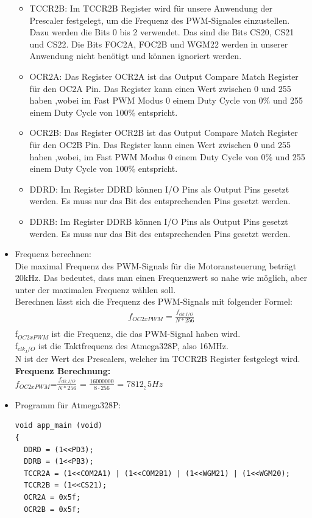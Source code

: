 \begin{itemize}
\begin{itemize}
\begin{itemize}
\end{itemize} 
\item TCCR2B: Im TCCR2B Register wird für unsere Anwendung der Prescaler festgelegt, um die Frequenz des PWM-Signales einzustellen. Dazu werden die Bits 0 bis 2 verwendet. Das sind die Bits CS20, CS21 und CS22. Die Bits FOC2A, FOC2B und WGM22 werden in unserer Anwendung nicht benötigt und können ignoriert werden. \\
\item OCR2A: Das Register OCR2A ist das Output Compare Match Register für den OC2A Pin. Das Register kann einen Wert zwischen 0 und 255 haben ,wobei im Fast PWM Modus 0 einem Duty Cycle von 0\% und 255 einem Duty Cycle von 100\% entspricht.\\
\item OCR2B: Das Register OCR2B ist das Output Compare Match Register für den OC2B Pin. Das Register kann einen Wert zwischen 0 und 255 haben ,wobei, im Fast PWM Modus 0 einem Duty Cycle von 0\% und 255 einem Duty Cycle von 100\% entspricht.\\
\item DDRD: Im Register DDRD können I/O Pins als Output Pins gesetzt werden. Es muss nur das Bit des entsprechenden Pins gesetzt werden.\\
\item DDRB: Im Register DDRB können I/O Pins als Output Pins gesetzt werden. Es muss nur das Bit des entsprechenden Pins gesetzt werden.\\
\end{itemize}
\item Frequenz berechnen:\\
Die maximal Frequenz des PWM-Signals für die Motoransteuerung beträgt 20kHz. Das bedeutet, dass man einen Frequenzwert so nahe wie möglich, aber unter der maximalen Frequenz wählen soll.\\
Berechnen lässt sich die Frequenz des PWM-Signals mit folgender Formel:
\begin{align*}
f_{OC2xPWM}=\frac{f_{clk\_I/O}}{N*256} \\
\end{align*} 
f$_{OC2xPWM}$ ist die Frequenz, die das PWM-Signal haben wird.\\
f$_{clk_I/O}$ ist die Taktfrequenz des Atmega328P, also 16MHz. \\
N ist der Wert des Prescalers, welcher im TCCR2B Register festgelegt wird. \\

\textbf{Frequenz Berechnung:}\\
$f_{OC2xPWM}$=$\frac{f_{clk\_I/O}}{N*256}$ = $\frac{16000000}{8 \cdot 256}$ = $\underline{7812,5Hz}$
\item Programm für Atmega328P: \\
\begin{lstlisting}[caption=$\mu$C-Programm,style=C]
void app_main (void)
{
  DDRD = (1<<PD3);
  DDRB = (1<<PB3);
  TCCR2A = (1<<COM2A1) | (1<<COM2B1) | (1<<WGM21) | (1<<WGM20);
  TCCR2B = (1<<CS21);
  OCR2A = 0x5f;
  OCR2B = 0x5f;
  

\end{lstlisting}
\end{itemize}
